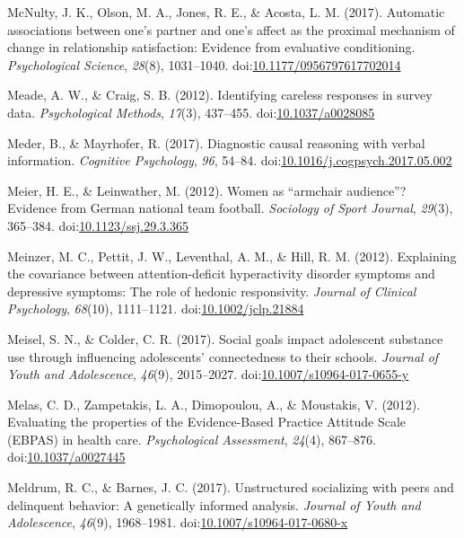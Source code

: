 \documentclass[english,man]{apa6}
\theoremstyle{definition}
\theoremstyle{definition}
\theoremstyle{definition}
\theoremstyle{remark}
\begin{document}
\hypertarget{ref-McNulty2017}{}
McNulty, J. K., Olson, M. A., Jones, R. E., \& Acosta, L. M. (2017).
Automatic associations between one's partner and one's affect as the
proximal mechanism of change in relationship satisfaction: Evidence from
evaluative conditioning. \emph{Psychological Science}, \emph{28}(8),
1031--1040.
doi:\href{https://doi.org/10.1177/0956797617702014}{10.1177/0956797617702014}

\hypertarget{ref-Meade2012}{}
Meade, A. W., \& Craig, S. B. (2012). Identifying careless responses in
survey data. \emph{Psychological Methods}, \emph{17}(3), 437--455.
doi:\href{https://doi.org/10.1037/a0028085}{10.1037/a0028085}

\hypertarget{ref-Meder2017}{}
Meder, B., \& Mayrhofer, R. (2017). Diagnostic causal reasoning with
verbal information. \emph{Cognitive Psychology}, \emph{96}, 54--84.
doi:\href{https://doi.org/10.1016/j.cogpsych.2017.05.002}{10.1016/j.cogpsych.2017.05.002}

\hypertarget{ref-Meier2012}{}
Meier, H. E., \& Leinwather, M. (2012). Women as ``armchair audience''?
Evidence from German national team football. \emph{Sociology of Sport
Journal}, \emph{29}(3), 365--384.
doi:\href{https://doi.org/10.1123/ssj.29.3.365}{10.1123/ssj.29.3.365}

\hypertarget{ref-Meinzer2012}{}
Meinzer, M. C., Pettit, J. W., Leventhal, A. M., \& Hill, R. M. (2012).
Explaining the covariance between attention-deficit hyperactivity
disorder symptoms and depressive symptoms: The role of hedonic
responsivity. \emph{Journal of Clinical Psychology}, \emph{68}(10),
1111--1121.
doi:\href{https://doi.org/10.1002/jclp.21884}{10.1002/jclp.21884}

\hypertarget{ref-Meisel2017}{}
Meisel, S. N., \& Colder, C. R. (2017). Social goals impact adolescent
substance use through influencing adolescents' connectedness to their
schools. \emph{Journal of Youth and Adolescence}, \emph{46}(9),
2015--2027.
doi:\href{https://doi.org/10.1007/s10964-017-0655-y}{10.1007/s10964-017-0655-y}

\hypertarget{ref-Melas2012}{}
Melas, C. D., Zampetakis, L. A., Dimopoulou, A., \& Moustakis, V.
(2012). Evaluating the properties of the Evidence-Based Practice
Attitude Scale (EBPAS) in health care. \emph{Psychological Assessment},
\emph{24}(4), 867--876.
doi:\href{https://doi.org/10.1037/a0027445}{10.1037/a0027445}

\hypertarget{ref-Meldrum2017}{}
Meldrum, R. C., \& Barnes, J. C. (2017). Unstructured socializing with
peers and delinquent behavior: A genetically informed analysis.
\emph{Journal of Youth and Adolescence}, \emph{46}(9), 1968--1981.
doi:\href{https://doi.org/10.1007/s10964-017-0680-x}{10.1007/s10964-017-0680-x}
\end{document}
